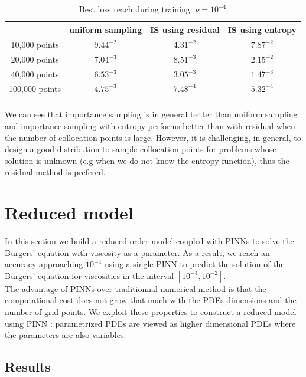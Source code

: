 \documentclass[12pt,openany]{amsbook}
\begin{document}
\begin{table}[ht!]
    \centering
    \begin{tabular}{c c c c }
        \toprule
         & uniform sampling & IS using residual & IS using entropy\\
        \midrule
        10,000 points  & $9.44^{-2}$ & $4.31^{-2}$ & $7.87^{-2}$\\
        20,000 points  & $7.04^{-3}$ & $8.51^{-3}$ & $2.15^{-2}$\\
        40,000 points  & $6.53^{-3}$ & $3.05^{-3}$ & $1.47^{-3}$\\
        100,000 points & $4.75^{-3}$ & $7.48^{-4}$ & $5.32^{-4}$\\
        \bottomrule\\
    \end{tabular}
    \caption{Best loss reach during training. $\nu = 10^{-4}$}
    \label{table:resentr1}
\end{table}

We can see that importance sampling  is in general better than uniform sampling and 
importance sampling with entropy performs better than with residual when the number of collocation points is large. 
However, it is challenging, in general, to design a good distribution to sample collocation points
for problems whose solution is unknown (e.g when we do not know the entropy function), thus the residual method is prefered.

\section{Reduced model}

In this section we build a reduced order model coupled with PINNs to solve the Burgers' equation
with viscosity as a parameter. As a result, we reach an accuracy approaching $10^{-4}$ using a 
single PINN to predict the solution of the Burgers' equation for viscosities in the interval $[10^{-4}, 10^{-2}]$.\\

The advantage of PINNs over traditionnal numerical method is that 
the computational cost does not grow that much with the PDEs dimensions and the number of grid points. 
We exploit these properties to construct a reduced model using PINN : parametrized PDEs are viewed
as higher dimensional PDEs where the parameters are also variables.

\subsection{Results}
\end{document}
